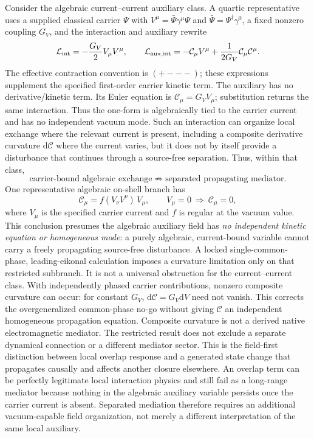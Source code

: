 \documentclass[11pt]{article}
\theoremstyle{definition}
\newcommand{\dd}{\mathrm{d}}
\newcommand{\Lag}{\mathcal{L}}
\begin{document}
Consider the algebraic current--current auxiliary class.
A quartic representative uses a supplied classical
carrier $\Psi$ with $V^\mu=\bar\Psi\gamma^\mu\Psi$ and
$\bar\Psi=\Psi^\dagger\gamma^0$, a fixed nonzero coupling $G_V$, and
the interaction and auxiliary rewrite
\[
 \Lag_{\rm int}=-\frac{G_V}{2}V_\mu V^\mu,
 \qquad
 \Lag_{\rm aux,int}=-\mathcal C_\mu V^\mu
                 +\frac{1}{2G_V}\mathcal C_\mu\mathcal C^\mu.
\]
The effective contraction convention is $(+---)$; these expressions supplement
the specified first-order carrier kinetic term.  The auxiliary has no
derivative/kinetic term.  Its Euler equation is
$\mathcal C_\mu=G_VV_\mu$; substitution returns the same interaction.
Thus the one-form is algebraically tied to the carrier current and has no
independent vacuum mode.  Such an interaction can organize local exchange where the relevant current is present, including a composite derivative curvature $\dd\mathcal C$ where the current varies, but it does not by itself provide a disturbance that continues through a source-free separation.  Thus, within that class,
\begin{equation}
 \boxed{
 \text{carrier-bound algebraic exchange}
 \not\Rightarrow
 \text{separated propagating mediator}.}
 \label{eq:b4_negative}
\end{equation}
One representative algebraic on-shell branch has
\begin{equation}
 \mathcal C_\mu=f(V_\nu V^\nu)\,V_\mu,
 \qquad V_\mu=0\ \Longrightarrow\ \mathcal C_\mu=0,
 \label{eq:b4_auxiliary_on_shell}
\end{equation}
where $V_\mu$ is the specified carrier current and $f$ is regular at the vacuum value.  This conclusion presumes the algebraic auxiliary field has \emph{no independent kinetic equation or homogeneous mode}: a purely algebraic, current-bound variable cannot carry a freely propagating source-free disturbance.  A locked single-common-phase, leading-eikonal calculation imposes a
curvature limitation only on that restricted subbranch.  It is not a
universal obstruction for the current--current class.  With independently
phased carrier contributions, nonzero composite curvature can occur:
for constant $G_V$, $\dd\mathcal C=G_V\dd V$ need not vanish.
This corrects the overgeneralized common-phase no-go without giving
$\mathcal C$ an independent homogeneous propagation equation.  Composite
curvature is not a derived native electromagnetic mediator.
The restricted result does not exclude a separate dynamical connection or a different mediator sector.  This is the field-first distinction between local overlap response and a generated state change that propagates causally and affects another closure elsewhere.  An overlap term can be perfectly legitimate local interaction physics and still fail as a long-range mediator because nothing in the algebraic auxiliary variable persists once the carrier current is absent.  Separated mediation therefore requires an additional vacuum-capable field organization, not merely a different interpretation of the same local auxiliary.
\end{document}
